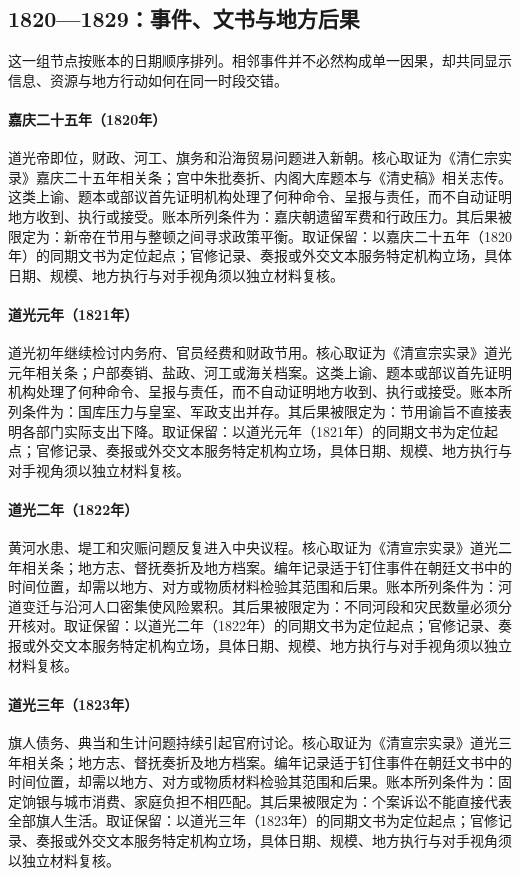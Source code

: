 \subsection{1820—1829：事件、文书与地方后果}
这一组节点按账本的日期顺序排列。相邻事件并不必然构成单一因果，却共同显示信息、资源与地方行动如何在同一时段交错。
\hypertarget{ledger:EQ-1820-DAO-GUANG-ACCESSION}{}\paragraph{嘉庆二十五年（1820年）}道光帝即位，财政、河工、旗务和沿海贸易问题进入新朝。核心取证为《清仁宗实录》嘉庆二十五年相关条；宫中朱批奏折、内阁大库题本与《清史稿》相关志传。这类上谕、题本或部议首先证明机构处理了何种命令、呈报与责任，而不自动证明地方收到、执行或接受。账本所列条件为：嘉庆朝遗留军费和行政压力。其后果被限定为：新帝在节用与整顿之间寻求政策平衡。取证保留：以嘉庆二十五年（1820年）的同期文书为定位起点；官修记录、奏报或外交文本服务特定机构立场，具体日期、规模、地方执行与对手视角须以独立材料复核。
\hypertarget{ledger:EQ-1821-IMPERIAL-ECONOMY}{}\paragraph{道光元年（1821年）}道光初年继续检讨内务府、官员经费和财政节用。核心取证为《清宣宗实录》道光元年相关条；户部奏销、盐政、河工或海关档案。这类上谕、题本或部议首先证明机构处理了何种命令、呈报与责任，而不自动证明地方收到、执行或接受。账本所列条件为：国库压力与皇室、军政支出并存。其后果被限定为：节用谕旨不直接表明各部门实际支出下降。取证保留：以道光元年（1821年）的同期文书为定位起点；官修记录、奏报或外交文本服务特定机构立场，具体日期、规模、地方执行与对手视角须以独立材料复核。
\hypertarget{ledger:EQ-1822-YELLOW-RIVER-FLOOD}{}\paragraph{道光二年（1822年）}黄河水患、堤工和灾赈问题反复进入中央议程。核心取证为《清宣宗实录》道光二年相关条；地方志、督抚奏折及地方档案。编年记录适于钉住事件在朝廷文书中的时间位置，却需以地方、对方或物质材料检验其范围和后果。账本所列条件为：河道变迁与沿河人口密集使风险累积。其后果被限定为：不同河段和灾民数量必须分开核对。取证保留：以道光二年（1822年）的同期文书为定位起点；官修记录、奏报或外交文本服务特定机构立场，具体日期、规模、地方执行与对手视角须以独立材料复核。
\hypertarget{ledger:EQ-1823-BANNER-DEBT}{}\paragraph{道光三年（1823年）}旗人债务、典当和生计问题持续引起官府讨论。核心取证为《清宣宗实录》道光三年相关条；地方志、督抚奏折及地方档案。编年记录适于钉住事件在朝廷文书中的时间位置，却需以地方、对方或物质材料检验其范围和后果。账本所列条件为：固定饷银与城市消费、家庭负担不相匹配。其后果被限定为：个案诉讼不能直接代表全部旗人生活。取证保留：以道光三年（1823年）的同期文书为定位起点；官修记录、奏报或外交文本服务特定机构立场，具体日期、规模、地方执行与对手视角须以独立材料复核。
